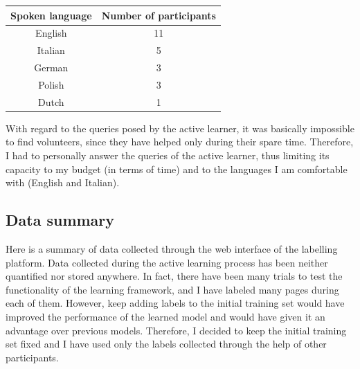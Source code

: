             \begin{table}[h]
                \centering
                \begin{tabular}{|c|c|}
                    \hline
                    Spoken language & Number of participants \\ \hline \hline
                    English & 11 \\ \hline
                    Italian & 5 \\ \hline
                    German & 3 \\ \hline
                    Polish & 3 \\ \hline
                    Dutch & 1 \\ \hline
                \end{tabular}
            \end{table}
            
            With regard to the queries posed by the active learner, it was basically impossible to find volunteers, since they have helped only during their spare time. Therefore, I had to personally answer the queries of the active learner, thus limiting its capacity to my budget (in terms of time) and to the languages I am comfortable with (English and Italian). 
        \subsection{Data summary}
            Here is a summary of data collected through the web interface of the labelling platform. Data collected during the active learning process has been neither quantified nor stored anywhere. In fact, there have been many trials to test the functionality of the learning framework, and I have labeled many pages during each of them. However, keep adding labels to the initial training set would have improved the performance of the learned model and would have given it an advantage over previous models. Therefore, I decided to keep the initial training set fixed and I have used only the labels collected through the help of other participants.
            
